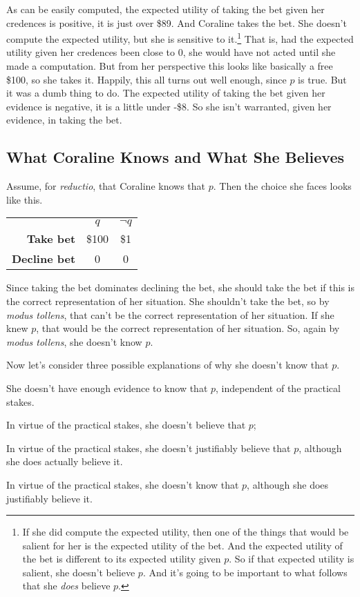 \documentclass[11pt,oneside]{book}
\begin{document}
\noindent As can be easily computed, the expected utility of taking the bet given her credences is positive, it is just over \$89. And Coraline takes the bet. She doesn't compute the expected utility, but she is sensitive to it.\footnote{If she did compute the expected utility, then one of the things that would be salient for her is the expected utility of the bet. And the expected utility of the bet is different to its expected utility given $p$. So if that expected utility is salient, she doesn't believe $p$. And it's going to be important to what follows that she \textit{does} believe $p$.} That is, had the expected utility given her credences been close to 0, she would have not acted until she made a computation. But from her perspective this looks like basically a free \$100, so she takes it. Happily, this all turns out well enough, since $p$ is true. But it was a dumb thing to do. The expected utility of taking the bet given her evidence is negative, it is a little under -\$8. So she isn't warranted, given her evidence, in taking the bet.

\subsection{What Coraline Knows and What She Believes}

Assume, for \textit{reductio}, that Coraline knows that $p$. Then the choice she faces looks like this.

\begin{center}
\begin{tabular}{r c c}
 & \textbf{$q$} & \textbf{$\neg q$}  \\
\textbf{Take bet} & \$100 & \$1 \\
\textbf{Decline bet} & 0 & 0\\
\end{tabular}
\end{center}

\noindent Since taking the bet dominates declining the bet, she should take the bet if this is the correct representation of her situation. She shouldn't take the bet, so by \textit{modus tollens}, that can't be the correct representation of her situation. If she knew $p$, that would be the correct representation of her situation. So, again by \textit{modus tollens}, she doesn't know $p$.

Now let's consider three possible explanations of why she doesn't know that $p$.

\begin{enumerate*}
\item She doesn't have enough evidence to know that $p$, independent of the practical stakes.
\item In virtue of the practical stakes, she doesn't believe that $p$;
\item In virtue of the practical stakes, she doesn't justifiably believe that $p$, although she does actually believe it.
\item In virtue of the practical stakes, she doesn't know that $p$, although she does justifiably believe it.
\end{enumerate*}
\end{document}
